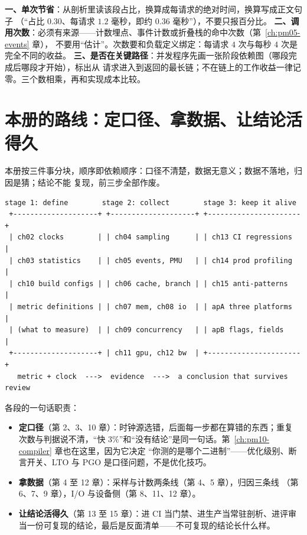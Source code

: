 \documentclass[12pt,a4paper,fontset=fandol]{ctexbook}
\begin{document}
\begin{guideline}[title={开工前先算的三个数}]
\small
\textbf{一、单次节省}：从剖析里读该段占比，换算成每请求的绝对时间，换算写成正文句子
（``占比 $0.30$、每请求 $1.2$ 毫秒，即约 $0.36$ 毫秒''），不要只报百分比。
\textbf{二、调用次数}：必须有来源——计数埋点、事件计数或折叠栈的命中次数（第~\ref{ch:pm05-events} 章），
不要用``估计''。次数要和负载定义绑定：每请求 $4$ 次与每秒 $4$ 次是完全不同的收益。
\textbf{三、是否在关键路径}：并发程序先画一张阶段依赖图（哪段完成后哪段才开始），标出从
请求进入到返回的最长链；不在链上的工作收益一律记零。三个数相乘，再和实现成本比较。
\end{guideline}

\section{本册的路线：定口径、拿数据、让结论活得久}
\label{sec:pm01-roadmap}

本册按三件事分块，顺序即依赖顺序：口径不清楚，数据无意义；数据不落地，归因是猜；结论不能
复现，前三步全部作废。

\begin{lstlisting}[style=outstyle,caption={本册三段式路线的框图（示意排版，不是任何
工具的输出，不含任何数值）},label={lst:pm01-route}]
  stage 1: define        stage 2: collect        stage 3: keep it alive
 +--------------------+ +--------------------+ +----------------------+
 | ch02 clocks        | | ch04 sampling      | | ch13 CI regressions  |
 | ch03 statistics    | | ch05 events, PMU   | | ch14 prod profiling  |
 | ch10 build configs | | ch06 cache, branch | | ch15 anti-patterns   |
 | metric definitions | | ch07 mem, ch08 io  | | apA three platforms  |
 | (what to measure)  | | ch09 concurrency   | | apB flags, fields    |
 +--------------------+ | ch11 gpu, ch12 bw  | +----------------------+
   metric + clock  --->  evidence  --->  a conclusion that survives review
\end{lstlisting}

各段的一句话职责：

\begin{itemize}
  \item \textbf{定口径}（第 2、3、10 章）：时钟源选错，后面每一步都在算错的东西；重复
    次数与判据说不清，``快 $3\%$''和``没有结论''是同一句话。第~\ref{ch:pm10-compiler} 章也在这里，因为它决定
    ``你测的是哪个二进制''——优化级别、断言开关、LTO 与 PGO 是口径问题，不是优化技巧。
  \item \textbf{拿数据}（第 4 至 12 章）：采样与计数两条线（第 4、5 章），归因三条线
    （第 6、7、9 章），I/O 与设备侧（第 8、11、12 章）。
  \item \textbf{让结论活得久}（第 13 至 15 章）：进 CI 当门禁、进生产当常驻剖析、进评审
    当一份可复现的结论，最后是反面清单——不可复现的结论长什么样。
\end{itemize}
\end{document}
